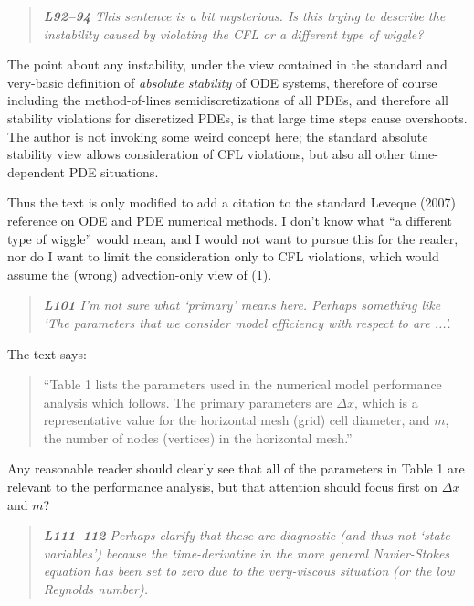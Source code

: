 \documentclass[letterpaper,final,12pt,reqno]{amsart}
\newenvironment{review}%
{\bigskip \par \begin{quote} \selectfont \sl}%
{\end{quote}}
\begin{document}
\begin{review}
\textbf{L92--94} This sentence is a bit mysterious. Is this trying to describe the instability caused by violating the CFL or a different type of wiggle?
\end{review}

\noindent The point about any instability, under the view contained in the standard and very-basic definition of \emph{absolute stability} of ODE systems, therefore of course including the method-of-lines semidiscretizations of all PDEs, and therefore all stability violations for discretized PDEs, is that large time steps cause overshoots.  The author is not invoking some weird concept here; the standard absolute stability view allows consideration of CFL violations, but also all other time-dependent PDE situations.

Thus the text is only modified to add a citation to the standard Leveque (2007) reference on ODE and PDE numerical methods.  I don't know what ``a different type of wiggle'' would mean, and I would not want to pursue this for the reader, nor do I want to limit the consideration only to CFL violations, which would assume the (wrong) advection-only view of (1).

\begin{review}
\textbf{L101} I'm not sure what ‘primary’ means here. Perhaps something like ‘The parameters that we consider model efficiency with respect to are ...’.
\end{review}

\noindent The text says:

\begin{quote}
``Table 1 lists the parameters used in the numerical model performance analysis which follows.  The primary parameters are $\Delta x$, which is a representative value for the horizontal mesh (grid) cell diameter, and $m$, the number of nodes (vertices) in the horizontal mesh.''
\end{quote}

Any reasonable reader should clearly see that all of the parameters in Table 1 are relevant to the performance analysis, but that attention should focus first on $\Delta x$ and $m$?

\begin{review}
\textbf{L111--112} Perhaps clarify that these are diagnostic (and thus not `state variables') because the time-derivative in the more general Navier-Stokes equation has been set to zero due to the very-viscous situation (or the low Reynolds number).
\end{review}
\end{document}
